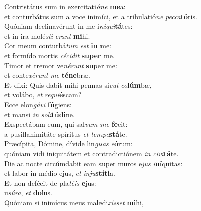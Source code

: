 \evenverse Contristátus sum in exercitati\textit{ó}\textit{ne} \textbf{me}a:~\*\\
\evenverse et conturbátus sum a voce inimíci, et a tribulatió\textit{ne} \textit{pec}\textit{ca}\textbf{tó}ris.\\
\oddverse Quóniam declinavérunt in me i\textit{ni}\textit{qui}\textbf{tá}tes:~\*\\
\oddverse et in ira molé\textit{sti} \textit{e}\textit{rant} \textbf{mi}hi.\\
\evenverse Cor meum conturbá\textit{tum} \textit{est} \textbf{in} me:~\*\\
\evenverse et formído mortis \textit{cé}\textit{ci}\textit{dit} \textbf{su}\textbf{per} me.\\
\oddverse Timor et tremor ve\textit{né}\textit{runt} \textbf{su}per me:~\*\\
\oddverse et conte\textit{xé}\textit{runt} \textit{me} \textbf{té}\textbf{ne}bræ.\\
\evenverse Et dixi: Quis dabit mihi pennas si\textit{cut} \textit{co}\textbf{lúm}bæ,~\*\\
\evenverse et volábo, \textit{et} \textit{re}\textit{qui}\textbf{é}scam?\\
\oddverse Ecce elon\textit{gá}\textit{vi} \textbf{fú}giens:~\*\\
\oddverse et mansi \textit{in} \textit{so}\textit{li}\textbf{tú}\textbf{di}ne.\\
\evenverse Exspectábam eum, qui sal\textit{vum} \textit{me} \textbf{fe}cit:~\*\\
\evenverse a pusillanimitáte spíritus \textit{et} \textit{tem}\textit{pe}\textbf{stá}te.\\
\oddverse Præcípita, Dómine, dívide lin\textit{guas} \textit{e}\textbf{ó}rum:~\*\\
\oddverse quóniam vidi iniquitátem et contradictiónem \textit{in} \textit{ci}\textit{vi}\textbf{tá}te.\\
\evenverse Die ac nocte circúmdabit eam super muros e\textit{jus} \textit{i}\textbf{ní}quitas:~\*\\
\evenverse et labor in médio ejus, \textit{et} \textit{in}\textit{ju}\textbf{stí}\textbf{ti}a.\\
\oddverse Et non defécit de pla\textit{té}\textit{is} \textbf{e}jus:~\*\\
\oddverse u\textit{sú}\textit{ra}, \textit{et} \textbf{do}lus.\\
\evenverse Quóniam si inimícus meus maledi\textit{xís}\textit{set} \textbf{mi}hi,~\*\\
